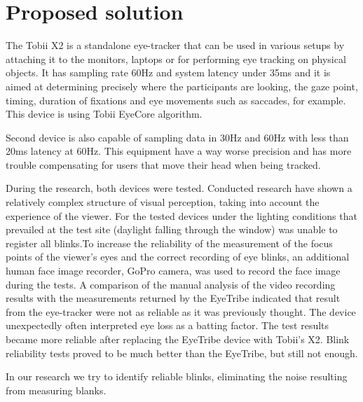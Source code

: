 \documentclass[runningheads,a4paper]{llncs}
\begin{document}
\section{Proposed solution} 
The Tobii X2 is a standalone eye-tracker that can be used in various setups by attaching it to the monitors, laptops or for performing eye tracking on physical objects. It has sampling rate 60Hz and system latency under 35ms and it is aimed at determining precisely where the participants are looking, the gaze point, timing, duration of fixations and eye movements such as saccades, for example. This device is using Tobii EyeCore\textsuperscript{\tiny\textregistered} algorithm. 
\par Second device is also capable of sampling data in 30Hz and 60Hz with less than 20ms latency at 60Hz. This equipment have a way worse precision and has more trouble compensating for users that move their head when being tracked. 
\newline\par
During the research, both devices were tested.
Conducted research have shown a relatively complex structure of visual perception, taking into account the experience of the viewer.
For the tested devices under the lighting conditions that prevailed at the test site (daylight falling through the window) was unable to register all blinks.To increase the reliability of the measurement of the focus points of the viewer's eyes and the correct recording of eye blinks, an additional human face image recorder, GoPro camera, was used to record the face image during the tests.
A comparison of the manual analysis of the video recording results with the measurements returned by the EyeTribe indicated that  result from the eye-tracker were not as reliable as it was previously thought. The device unexpectedly often interpreted eye loss as a batting factor. The test results became more reliable after replacing the EyeTribe device with Tobii's X2. Blink reliability tests proved to be much better than the EyeTribe, but still not enough.

In our research we try to identify reliable blinks, eliminating the noise resulting from measuring blanks.






\end{document}

